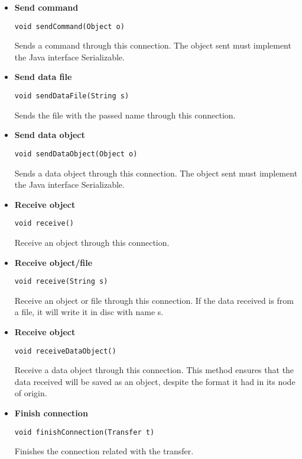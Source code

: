 \documentclass[10pt]{article}
\begin{document}
\begin{itemize}

	\item \textbf{Send command}
	\begin{lstlisting}
void sendCommand(Object o)
	\end{lstlisting}
	Sends a command through this connection. The object sent must implement the Java interface Serializable.
	
	\item \textbf{Send data file}
	\begin{lstlisting}
void sendDataFile(String s)
	\end{lstlisting}
	Sends the file with the passed name through this connection.
	
	\item \textbf{Send data object}
	\begin{lstlisting}
void sendDataObject(Object o)
	\end{lstlisting}
	Sends a data object through this connection. The object sent must implement the Java interface Serializable.
	
	\item \textbf{Receive object}
	\begin{lstlisting}
void receive()
	\end{lstlisting}
	Receive an object through this connection.
	
	\item \textbf{Receive object/file}
	\begin{lstlisting}
void receive(String s)
	\end{lstlisting}
	Receive an object or file through this connection. If the data received is from a file, it will write it in disc with name s.
	
	\item \textbf{Receive object}
	\begin{lstlisting}
void receiveDataObject()
	\end{lstlisting}
	Receive a data object through this connection. This method ensures that the data received will be saved as an object, despite the format it had in its node of origin.
	
	\item \textbf{Finish connection}
	\begin{lstlisting}
void finishConnection(Transfer t)
	\end{lstlisting}
	Finishes the connection related with the transfer.
\end{itemize}
\end{document}
